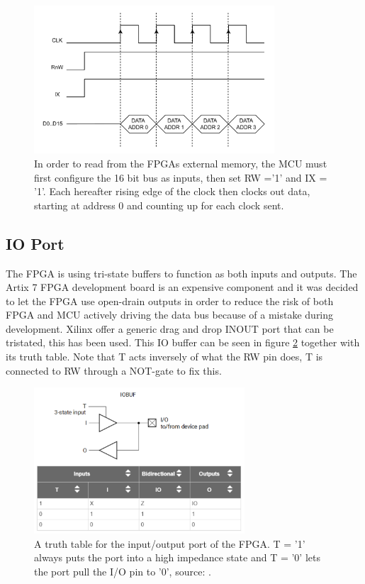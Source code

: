 \begin{figure}[H]
    \centering
    \includegraphics[clip, trim=0 0 0 0, width=0.8\textwidth]{Sections/7_SystemDesign/Figures/MCU_IX_FETCH.pdf}
    \caption{In order to read from the FPGAs external memory, the MCU must first configure the 16 bit bus as inputs, then set RW ='1' and IX = '1'. Each hereafter rising edge of the clock then clocks out data, starting at address 0 and counting up for each clock sent.}
    \label{fig_7_2_1_CommRead_IX}
\end{figure}

\subsection*{IO Port}
The FPGA is using tri-state buffers to function as both inputs and outputs. The Artix 7 FPGA development board is an expensive component and it was decided to let the FPGA use open-drain outputs in order to reduce the risk of both FPGA and MCU actively driving the data bus because of a mistake during development. Xilinx offer a generic drag and drop INOUT port that can be tristated, this has been used. This IO buffer can be seen in figure \ref{fig_7_2_1_IOBUF} together with its truth table. Note that T acts inversely of what the RW pin does, T is connected to RW through a NOT-gate to fix this.

\begin{figure}[H]
    \centering
    \includegraphics[clip, trim=0 0 0 0, width=0.7\textwidth]{Sections/7_SystemDesign/Figures/IOBUF.pdf}
    \caption{A truth table for the input/output port of the FPGA. T = '1' always puts the port into a high impedance state and T = '0' lets the port pull the I/O pin to '0', source: \cite{Xilinx_IOBUF}.}
    \label{fig_7_2_1_IOBUF}
\end{figure}

